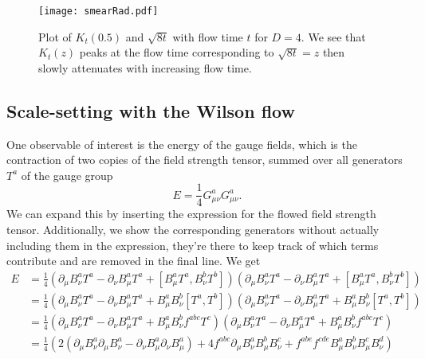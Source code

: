 \documentclass[a4paper,10pt]{book}
\begin{document}
\begin{figure}
\centering

\texttt{[image: smearRad.pdf]}
\caption[Smearing radius of the flow equations]{Plot of $K_t(0.5)$ and $\sqrt{8t}$ with flow time $t$ for $D=4$. We see that $K_t(z)$ peaks at the flow time corresponding to $\sqrt{8t}=z$ then slowly attenuates with increasing flow time. }\label{fig:flowTimeMeanSquareRadius}
\end{figure}

\subsection{Scale-setting with the Wilson flow}
One observable of interest is the energy of the gauge fields, which is the contraction of two copies of the field strength tensor, summed over all generators $T^a$ of the gauge group 
\begin{equation}\label{eq:energyDensity_continuum}
E=\frac{1}{4} G_{\mu \nu}^{a} G_{\mu \nu}^{a}.
\end{equation}
We can expand this by inserting the expression for the flowed field strength tensor. Additionally, we show the corresponding generators without actually including them in the expression, they're there to keep track of which terms contribute and are removed in the final line. We get
\begin{equation}
\begin{aligned} 
E&=\frac{1}{4} \left( \partial_{\mu} B^{a}_{\nu}T^{a}-\partial_{\nu} B^{a}_{\mu}T^{a}+\left[B^{a}_{\mu}T^{a}, B^{b}_{\nu}T^{b}\right] \right)\left( \partial_{\mu} B^{a}_{\nu}T^{a}-\partial_{\nu} B^{a}_{\mu}T^{a}+\left[B^{a}_{\mu}T^{a}, B^{b}_{\nu}T^{b}\right] \right)\\
&=\frac{1}{4} \left( \partial_{\mu} B^{a}_{\nu}T^{a}-\partial_{\nu} B^{a}_{\mu}T^{a}+B^{a}_{\mu}B^{b}_{\nu}\left[T^{a}, T^{b}\right] \right)\left( \partial_{\mu} B^{a}_{\nu}T^{a}-\partial_{\nu} B^{a}_{\mu}T^{a}+B^{a}_{\mu}B^{b}_{\nu}\left[T^{a}, T^{b}\right] \right)\\
&=\frac{1}{4} \left( \partial_{\mu} B^{a}_{\nu}T^{a}-\partial_{\nu} B^{a}_{\mu}T^{a}+B^{a}_{\mu}B^{b}_{\nu}f^{a b c} T^{c} \right)\left( \partial_{\mu} B^{a}_{\nu}T^{a}-\partial_{\nu} B^{a}_{\mu}T^{a}+B^{a}_{\mu}B^{b}_{\nu}f^{a b c} T^{c} \right)\\
&=\frac{1}{4}  \left( 2\left(\partial_{\mu} B^{a}_{\nu}\partial_{\mu} B^{a}_{\nu}-\partial_{\nu} B^{a}_{\mu}\partial_{\nu} B^{a}_{\mu}\right)+4f^{a b c}\partial_{\mu} B^{a}_{\nu} B^{b}_{\mu}B^{c}_{\nu}  + f^{a b e} f^{cde}  B^{a}_{\mu}B^{b}_{\nu} B^{c}_{\mu}B^{d}_{\nu} \right)
\end{aligned}
\end{equation}
\end{document}
